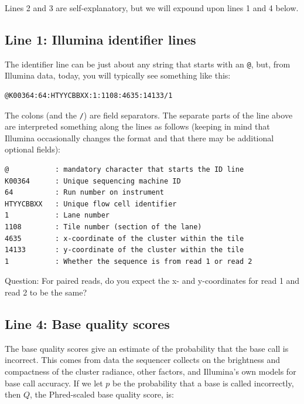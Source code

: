 \documentclass[]{krantz}
\begin{document}
Lines 2 and 3 are self-explanatory, but we will expound upon lines 1 and 4 below.

\hypertarget{line-1-illumina-identifier-lines}{%
\subsection{Line 1: Illumina identifier lines}\label{line-1-illumina-identifier-lines}}

The identifier line can be just about any string that starts with an \texttt{@}, but, from Illumina data, today,
you will typically see something like this:

\begin{verbatim}
@K00364:64:HTYYCBBXX:1:1108:4635:14133/1
\end{verbatim}

The colons (and the \texttt{/}) are field separators. The separate parts of the line
above are interpreted something along the lines as follows (keeping in mind that
Illumina occasionally changes the format and that there may be additional
optional fields):

\begin{verbatim}
@           : mandatory character that starts the ID line
K00364      : Unique sequencing machine ID 
64          : Run number on instrument
HTYYCBBXX   : Unique flow cell identifier
1           : Lane number
1108        : Tile number (section of the lane)
4635        : x-coordinate of the cluster within the tile
14133       : y-coordinate of the cluster within the tile
1           : Whether the sequence is from read 1 or read 2 
\end{verbatim}

Question: For paired reads, do you expect the x- and y-coordinates for read 1 and read 2 to
be the same?

\hypertarget{line-4-base-quality-scores}{%
\subsection{Line 4: Base quality scores}\label{line-4-base-quality-scores}}

The base quality scores give an estimate of the probability that the base call is incorrect.
This comes from data the sequencer collects on the brightness and compactness of the cluster
radiance, other factors, and Illumina's own models for base call accuracy. If we let \(p\)
be the probability that a base is called incorrectly, then \(Q\), the Phred-scaled base quality
score, is:
\end{document}
